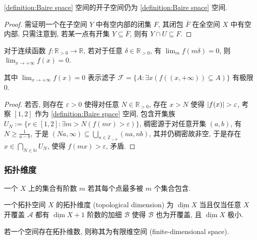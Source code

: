 \begin{lemma}
    \ref{definition:Baire space} 空间的开子空间仍为 \ref{definition:Baire space} 空间.

    \begin{proof}
        需证明一个在子空间 \(Y\) 中有空内部的闭集 \(F\), 其闭包 \(\overline{F}\) 在全空间 \(X\) 中有空内部,
        只需注意到, 若某一点有开集 \(Y \subseteq \overline{F}\), 则有 \(Y \cap U \subseteq F\).
    \end{proof}
\end{lemma}

\begin{example}
    对于连续函数 \(f : \mathbb{R}_{>0} \to \mathbb{R}\), 若对于任意 \(\delta \in \mathbb{R}_{> 0}\), 有 
    \(\lim_{m} f (m \delta) = 0\), 则 \(\lim_{x \to +\infty} f (x) = 0\).

    其中 \(\lim_{x \to +\infty} f (x) = 0\) 表示滤子 \(\mathcal{F} = \{A : \exists x (f((x,+\infty)) \subseteq A)\}\) 有极限 \(0\).

    \begin{proof}
        若否, 则存在 \(\varepsilon > 0\) 使得对任意 \(N \in \mathbb{R}_{>0}\), 存在 \(x > N\) 使得 \(\abs{f(x)} > \varepsilon\),
        考察 \([1,2]\) 作为 \ref{definition:Baire space} 空间, 包含开集族 \(U_N := \{r \in [1,2] : \exists m > N (f(m r) > \varepsilon)\}\),
        稠密源于对任意开集 \((a,b)\), 有 \(N \ge \frac{1}{a - b}\), 于是 \((N a, \infty) \subseteq \bigcup_{n \in \mathbb{Z}_{> 0}} (n a, n b)\),
        其并仍稠密故非空, 于是存在 \(x \in \bigcap_{N \in \mathbb{N}} U_N\), 使得 \(f(m x) > \varepsilon\), 矛盾.
    \end{proof}
\end{example}

\subsubsection{拓扑维度}

\begin{definition}[阶数]
    一个 \(X\) 上的集合有阶数 \(m\) 若其每个点最多被 \(m\) 个集合包含.
\end{definition}

\begin{definition}[拓扑维度]
    \label {definition:dimension of topological space}
    一个拓扑空间 \(X\) 的拓扑维度 (topological dimension) 为 \(\underline{\dim} X\) 当且仅当任意 \(X\) 开覆盖 \(\mathcal{A}\) 都有 \(\underline{\dim} X+1\) 阶数的加细 \(\mathcal{B}\) 
    使得 \(\mathcal{B}\) 也为开覆盖, 且 \(\underline{\dim} X\) 极小.

    若一个空间存在拓扑维数, 则称其为有限维空间 (finite-dimensional space).
\end{definition}

